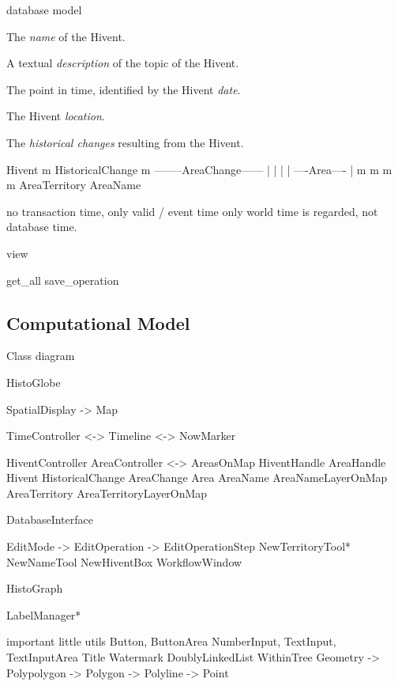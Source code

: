 database model

\begin{compactenum}
  \item The \emph{name} of the Hivent.
  \item A textual \emph{description} of the topic of the Hivent.
  \item The point in time, identified by the Hivent \emph{date}.
  \item The Hivent \emph{location}.
  \item The \emph{historical changes} resulting from the Hivent.
\end{compactenum}


           Hivent
             m
       HistoricalChange
             m
  --------AreaChange------
  |          |           |
  |     ----Area----     |
  m     m          m     m
AreaTerritory      AreaName

no transaction time, only valid / event time
only world time is regarded, not database time.

view

get\_all
save\_operation



\subsection{Computational Model} %
\label{sub:computational_model}

Class diagram

HistoGlobe

SpatialDisplay -> Map

TimeController  <-> Timeline
                <-> NowMarker

HiventController                AreaController <->  AreasOnMap
HiventHandle                    AreaHandle
Hivent
HistoricalChange    AreaChange  Area
                                AreaName            AreaNameLayerOnMap
                                AreaTerritory       AreaTerritoryLayerOnMap

DatabaseInterface

EditMode -> EditOperation -> EditOperationStep
NewTerritoryTool* NewNameTool NewHiventBox
WorkflowWindow

HistoGraph

LabelManager*

important little utils
  Button, ButtonArea
  NumberInput, TextInput, TextInputArea
  Title
  Watermark
  DoublyLinkedList
  WithinTree
  Geometry -> Polypolygon -> Polygon -> Polyline -> Point

